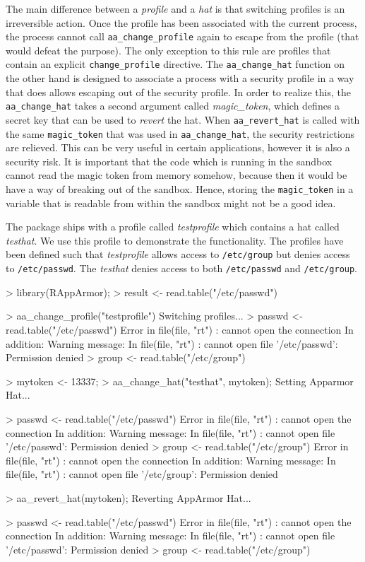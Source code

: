\documentclass[article]{jss}
\begin{document}
The main difference between a \emph{profile} and a \emph{hat} is that switching
profiles is an irreversible action. Once the profile has been associated with
the current process, the process cannot call \texttt{aa\_change\_profile} again
to escape from the profile (that would defeat the purpose). The only exception
to this rule are profiles that contain an explicit \texttt{change\_profile}
directive. The \texttt{aa\_change\_hat} function on the other hand is designed to
associate a process with a security profile in a way that does allows escaping
out of the security profile. In order to realize this, the
\texttt{aa\_change\_hat} takes a second argument called \emph{magic\_token},
which defines a secret key that can be used to \emph{revert} the hat. When
\texttt{aa\_revert\_hat} is called with the same \texttt{magic\_token} that
was used in \texttt{aa\_change\_hat}, the security restrictions are
relieved. This can be very useful in certain applications, however it is also a
security risk. It is important that the code which is running in the sandbox
cannot read the magic token from memory somehow, because then it would be
have a way of breaking out of the sandbox. Hence, storing the
\texttt{magic\_token} in a variable that is readable from within the sandbox
might not be a good idea.

The  package ships with a profile called \emph{testprofile} which
contains a hat called \emph{testhat}. We use this profile to demonstrate the
functionality. The profiles have been defined such that \emph{testprofile}
allows access to \texttt{/etc/group} but denies access to \texttt{/etc/passwd}.
The \emph{testhat} denies access to both \texttt{/etc/passwd} and
\texttt{/etc/group}.

\begin{CodeChunk}
\begin{CodeInput}
> library(RAppArmor);
> result <- read.table("/etc/passwd")

> aa_change_profile("testprofile")
Switching profiles...
> passwd <- read.table("/etc/passwd")
Error in file(file, "rt") : cannot open the connection
In addition: Warning message:
In file(file, "rt") : cannot open file '/etc/passwd': Permission denied
> group <- read.table("/etc/group")

> mytoken <- 13337;
> aa_change_hat("testhat", mytoken);
Setting Apparmor Hat...

> passwd <- read.table("/etc/passwd")
Error in file(file, "rt") : cannot open the connection
In addition: Warning message:
In file(file, "rt") : cannot open file '/etc/passwd': Permission denied
> group <- read.table("/etc/group")
Error in file(file, "rt") : cannot open the connection
In addition: Warning message:
In file(file, "rt") : cannot open file '/etc/group': Permission denied

> aa_revert_hat(mytoken);
Reverting AppArmor Hat...

> passwd <- read.table("/etc/passwd")
Error in file(file, "rt") : cannot open the connection
In addition: Warning message:
In file(file, "rt") : cannot open file '/etc/passwd': Permission denied
> group <- read.table("/etc/group")
\end{CodeInput}
\end{CodeChunk}
\end{document}
